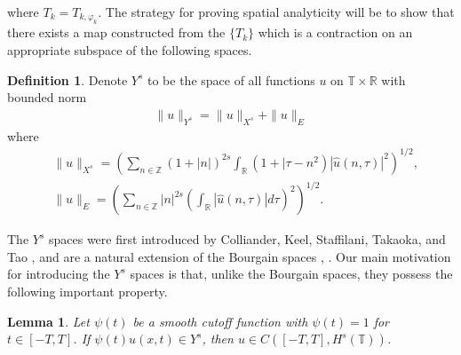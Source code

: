 \documentclass[12pt,reqno]{amsart}
\numberwithin{equation}{section}  %
\numberwithin{figure}{section}
\newcommand{\rr}{\mathbb{R}}
\newcommand{\zz}{\mathbb{Z}}
\newcommand{\ci}{\mathbb{T}}
\newcommand{\wh}{\widehat}
\newcommand{\vp}{\varphi}
\theoremstyle{plain}
\newtheorem{lemma}{Lemma}
\theoremstyle{definition}
\newtheorem{definition}{Definition}
\theoremstyle{remark}
\begin{document}
%
where $T_k = T_{k,\vp_k}$.
%
The strategy for proving spatial analyticity will be to show that there exists a
map constructed from the $\{T_k\}$ which is a
contraction on an appropriate subspace of the following spaces.
\begin{definition}
	Denote $Y^s$ to be the space of all
	functions $u$ on $\ci \times \rr$ with
	bounded norm
\begin{equation}
	\label{Y-s-norm}
	\begin{split}
    \|u\|_{Y^s} = \|u\|_{X^s} + \|u\|_E
  \end{split}
\end{equation}
%
%
%
%
where
%
\begin{equation}
	\label{X^s-norm}
	\begin{split}
		& \|u\|_{X^s}
		= \left ( \sum_{n\in \zz} \left (1 + |n| \right )^{2s} \int_\rr \left ( 1 + | 
		\tau - n^{2} \right ) | \wh{u} ( n, \tau ) |^2
		\right )^{1/2},
    \\
    & \|u\|_E = \left( \sum_{n \in \zz} | n |^{2s} \left(
    \int_{\rr} | \wh{u}(n, \tau) |d \tau
    \right)^{2} \right)^{1/2}.
	\end{split}
\end{equation}
%
%
%
\end{definition}
The $Y^s$ spaces were first introduced by Colliander, Keel, Staffilani, Takaoka,
and Tao \cite{Colliander:2003kx}, and are a natural extension of the Bourgain spaces
\cite{Bourgain-Fourier-transfo-1}, \cite{Bourgain-Fourier-transfo}. Our main
motivation for introducing the $Y^s$ spaces is that, unlike the
Bourgain spaces, they possess the
following important property.
%
%
\begin{lemma}
	\label{lem:cutoff-loc-soln}
	Let $\psi(t)$ be a smooth cutoff function with $\psi(t) =1$ for $t \in [-T, T]$. If
	$\psi(t)u(x,t) \in Y^s$, then $u \in C([-T, T], H^s(\ci))$.
\end{lemma}
%
%
%
%
%
%
%
%
%
%
\end{document}
